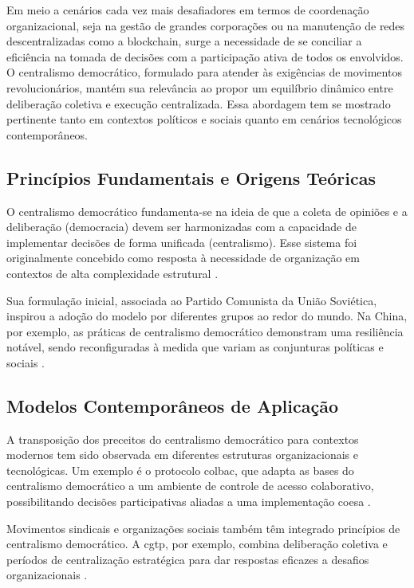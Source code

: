 Em meio a cenários cada vez mais desafiadores em termos de coordenação
organizacional, seja na gestão de grandes corporações ou na manutenção
de redes descentralizadas como a blockchain, surge a necessidade de se
conciliar a eficiência na tomada de decisões com a participação ativa
de todos os envolvidos. O centralismo democrático, formulado para
atender às exigências de movimentos revolucionários, mantém sua
relevância ao propor um equilíbrio dinâmico entre deliberação coletiva
e execução centralizada. Essa abordagem tem se mostrado pertinente
tanto em contextos políticos e sociais quanto em cenários tecnológicos
contemporâneos.

\subsection{Princípios Fundamentais e Origens Teóricas}
\label{sec:principios_origens_teoricas}

O centralismo democrático fundamenta-se na ideia de que a coleta de
opiniões e a deliberação (democracia) devem ser harmonizadas com a
capacidade de implementar decisões de forma unificada (centralismo).
Esse sistema foi originalmente concebido como resposta à necessidade
de organização em contextos de alta complexidade estrutural 
\cite{StillaCenturyoftheChineseModel,EstatutosDoPCP}.

Sua formulação inicial, associada ao Partido Comunista da União
Soviética, inspirou a adoção do modelo por diferentes grupos ao redor
do mundo. Na China, por exemplo, as práticas de centralismo
democrático demonstram uma resiliência notável, sendo reconfiguradas à
medida que variam as conjunturas políticas e sociais
\cite{ACenturyofDemocraticCentralism}.

\subsection{Modelos Contemporâneos de Aplicação}
\label{sec:modelos_contemporaneos}

A transposição dos preceitos do centralismo democrático para contextos
modernos tem sido observada em diferentes estruturas organizacionais e
tecnológicas. Um exemplo é o protocolo \gls{colbac}, que adapta as
bases do centralismo democrático a um ambiente de controle de acesso
colaborativo, possibilitando decisões participativas aliadas a uma
implementação coesa \cite{Colbac}.

Movimentos sindicais e organizações sociais também
têm integrado princípios de centralismo democrático. A
\gls{cgtp}, por exemplo, combina deliberação coletiva e períodos de
centralização estratégica para dar respostas eficazes a desafios
organizacionais \cite{CGTPStatutes}.

